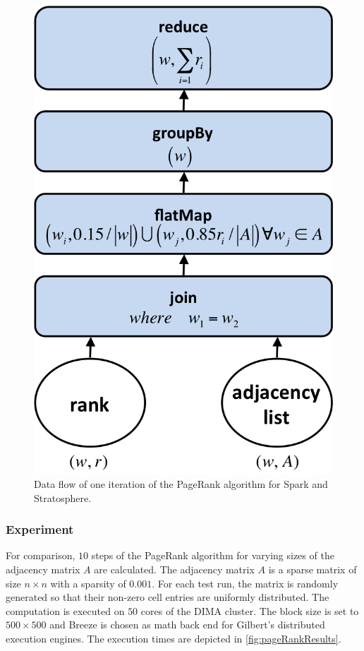 \begin{figure}[!h]
	\centering
	\includegraphics[width=.3\linewidth]{images/pageRankStep.png}
	\caption{Data flow of one iteration of the PageRank algorithm for Spark and Stratosphere.}
	\label{fig:pageRankDataFlow}
\end{figure}

\subsubsection{Experiment}

For comparison, $10$ steps of the PageRank algorithm for varying sizes of the adjacency matrix $A$ are calculated.
The adjacency matrix $A$ is a sparse matrix of size $n \times n$ with a sparsity of $0.001$.
For each test run, the matrix is randomly generated so that their non-zero cell entries are uniformly distributed.
The computation is executed on $50$ cores of the DIMA cluster.
The block size is set to $500 \times 500$ and Breeze is chosen as math back end for Gilbert's distributed execution engines.
The execution times are depicted in \cref{fig:pageRankResults}.

